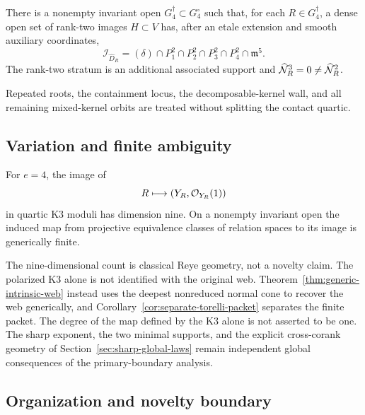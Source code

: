 \begin{theorem}
\label{thm:main-coranktwo}
There is a nonempty invariant open
\(G_4^\dagger\subset G_4^\circ\) such that, for each
\(R\in G_4^\dagger\), a dense open set of rank-two images
\(H\subset V\) has, after an etale extension and smooth auxiliary
coordinates,
\begin{equation}\label{eq:main-coranktwo}
 \mathcal I_{\widehat D_R}
 =
 (\delta)\cap P_1^2\cap P_2^2\cap P_3^2\cap P_4^2
 \cap\mathfrak m^5.
\end{equation}
The rank-two stratum is an additional associated support and
\(\widehat{\mathcal N}_R^3=0\ne\widehat{\mathcal N}_R^2\).
\end{theorem}

Repeated roots, the containment locus, the decomposable-kernel wall,
and all remaining mixed-kernel orbits are treated without splitting
the contact quartic.


\subsection{Variation and finite ambiguity}

\begin{theorem}
\label{thm:main-moduli}
For \(e=4\), the image of
\[
 R\longmapsto(Y_R,\mathcal O_{Y_R}(1))
\]
in quartic K3 moduli has dimension nine.  On a nonempty invariant
open the induced map from projective equivalence classes of relation
spaces to its image is generically finite.
\end{theorem}

The nine-dimensional count is classical Reye geometry, not a novelty
claim.  The polarized K3 alone is not identified with the original web.
Theorem~\ref{thm:generic-intrinsic-web} instead uses the deepest
nonreduced normal cone to recover the web generically, and
Corollary~\ref{cor:separate-torelli-packet} separates the finite
packet.  The degree of the map defined by the K3 alone is not asserted
to be one.  The sharp exponent, the two minimal supports, and the
explicit cross-corank geometry of
Section~\ref{sec:sharp-global-laws} remain independent global
consequences of the primary-boundary analysis.


\subsection{Organization and novelty boundary}

